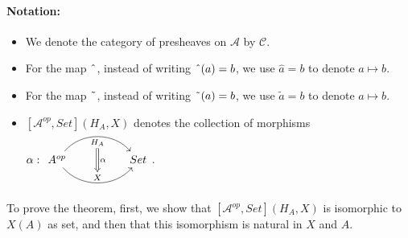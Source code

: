 \documentclass[18pt,a4paper]{article}
\theoremstyle{definition}
\begin{document}
	\paragraph{Notation:} \begin{itemize}
		\item We denote the category of presheaves on $\mathcal{A}$ by $\mathcal{C}$.
		\item For the map $\string ^$, instead of writing $\string ^ (a)=b$,
			we use $\hat{a} = b$ to denote $a \mapsto b$.

		\item For the map $\string ~$, instead of writing $\string ~ (a)=b$,
			we use $\tilde{a} = b$ to denote $a \mapsto b$.
		\item $[ \mathcal{A}^{op},Set](	H_A,X) $ denotes the collection of morphisms $\alpha: \begin{tikzcd}[row sep=large, column sep=huge]
				A^{op} \arrow[r,bend left=50, "H_A"{name=U, below}]
				\arrow[r, bend right = 50, "X"{name=D, above}]
					& Set
					\arrow[Rightarrow, from=U , to=D, "\alpha"]
			\end{tikzcd}$.
	\end{itemize}
	To prove the theorem,
	first, we show that $[ \mathcal{A} ^{op}, Set](H_A,X)$ is isomorphic to $X(A) $ as set,
	and then that this isomorphism is natural in $X$ and $A$.
\end{document}
